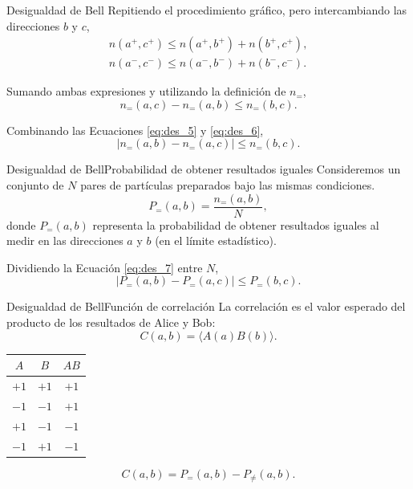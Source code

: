 \begin{frame}{Desigualdad de Bell}{}
Repitiendo el procedimiento gráfico, pero intercambiando las direcciones $b$ y $c$,
\begin{gather*}
	n(a^+,c^+) \leq n(a^+,b^+) + n(b^+,c^+),\\
	n(a^-,c^-) \leq n(a^-,b^-) + n(b^-,c^-).
\end{gather*}

Sumando ambas expresiones y utilizando la definición de $n_{=}$,
\begin{equation}
	n_{=}(a,c)-n_{=}(a,b)\leq n_{=}(b,c).
	\label{eq:des_6}
\end{equation}

Combinando las Ecuaciones \ref{eq:des_5} y \ref{eq:des_6},
\begin{equation}
	|n_{=}(a,b)-n_{=}(a,c)|\leq n_{=}(b,c).
	\label{eq:des_7}
\end{equation}
\end{frame}


\begin{frame}{Desigualdad de Bell}{Probabilidad de obtener resultados iguales}
Consideremos un conjunto de $N$ pares de partículas preparados bajo las mismas condiciones.
$$ P_{=}(a,b)=\frac{n_{=}(a,b)}{N}, $$
donde $P_{=}(a,b)$ representa la probabilidad de obtener resultados iguales al medir en las direcciones $a$ y $b$ (en el límite estadístico).
	
Dividiendo la Ecuación \ref{eq:des_7} entre $N$,
\begin{equation}
	|P_{=}(a,b)-P_{=}(a,c)|\leq P_{=}(b,c).
	\label{eq:des_proba}
\end{equation}
\end{frame}


\begin{frame}{Desigualdad de Bell}{Función de correlación}
La correlación es el valor esperado del producto de los resultados de Alice y Bob:
$$ C(a,b)=\langle A(a)B(b)\rangle. $$
\begin{center}
\begin{tabular}{c c c}
	\hline
	$A$ & $B$ & $AB$ \\
	\hline
	$+1$ & $+1$ & $+1$ \\
	$-1$ & $-1$ & $+1$ \\
	$+1$ & $-1$ & $-1$ \\
	$-1$ & $+1$ & $-1$ \\
	\hline
\end{tabular}
\end{center}

\begin{equation}
	C(a,b)=P_{=}(a,b)-P_{\neq}(a,b).
	\label{eq:correlacion}
\end{equation}
\end{frame}


